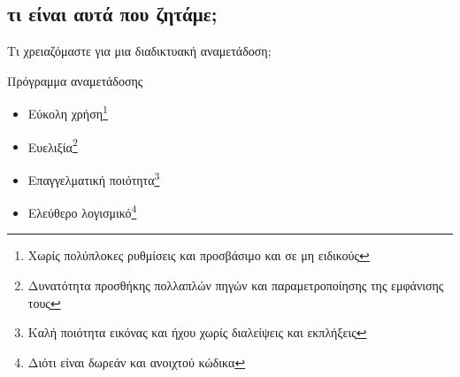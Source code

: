 \documentclass[aspectratio=169]{beamer}
\begin{document}
\subsection{τι είναι αυτά που ζητάμε;}
\begin{frame}{Τι χρειαζόμαστε για μια διαδικτυακή αναμετάδοση;}
  \begin{block}{Πρόγραμμα αναμετάδοσης}
    \begin{itemize}
      \item Εύκολη χρήση\footnote{Χωρίς πολύπλοκες ρυθμίσεις και προσβάσιμο και σε μη ειδικούς}
      \item Ευελιξία\footnote{Δυνατότητα προσθήκης πολλαπλών πηγών και παραμετροποίησης της εμφάνισης τους}
      \item Επαγγελματική ποιότητα\footnote{Καλή ποιότητα εικόνας και ήχου χωρίς διαλείψεις και εκπλήξεις}
      \item Ελεύθερο λογισμικό\footnote{Διότι είναι δωρεάν και ανοιχτού κώδικα}
    \end{itemize}
  \end{block}
\end{frame}
\end{document}
